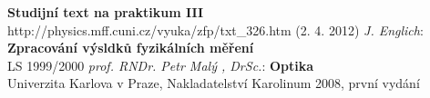 \documentclass[a4paper,12pt]{article}
\begin{document}
\begin{thebibliography}{5}
	 \textbf{Studijní text na praktikum III} \\http://physics.mff.cuni.cz/vyuka/zfp/txt\_326.htm (2. 4. 2012)
     \emph{J. Englich}: \textbf{Zpracování výsldků fyzikálních měření} \\ LS 1999/2000
     \emph{prof. RNDr. Petr Malý , DrSc.}: \textbf{Optika}\\Univerzita Karlova v Praze, Nakladatelství Karolinum 2008, první vydání
\end{thebibliography}
\end{document}
